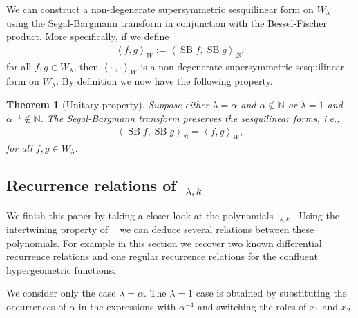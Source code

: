 \documentclass{amsart}
\newtheorem{theorem}{Theorem}
\numberwithin{theorem}{section}
\theoremstyle{definition}
\theoremstyle{remark}
\def\N{\mathds{N} }
\DeclareMathOperator{\KO}{\widetilde U}
\DeclareMathOperator{\SB}{\pil(C)}
\DeclareMathOperator{\rSB}{SB}
\newcommand{\bfip}[1]{\left<{#1}\right>_\mathcal B}
\newcommand{\ip}[1]{\left<{#1}\right>_W}
\DeclareMathOperator{\pil}{\pi_\lambda}
\begin{document}
We can construct a non-degenerate supersymmetric sesquilinear form on $W_\lambda$ using the Segal-Bargmann transform in conjunction with the Bessel-Fischer product. More specifically, if we define
\begin{align*}
\ip{f,g} := \bfip{\rSB f, \rSB g},
\end{align*}
for all $f,g\in W_\lambda$, then $\ip{\cdot \, , \cdot}$ is a non-degenerate supersymmetric sesquilinear form on $W_\lambda$. By definition we now have the following property.

\begin{theorem}[Unitary property]\label{PropUnitSB}
Suppose either $\lambda=\alpha$ and $\alpha\not\in \N$ or $\lambda=1$ and $\alpha^{-1}\not\in \N$. The Segal-Bargmann transform preserves the sesquilinear forms, i.e.,
\begin{align*}
\bfip{\rSB f,\rSB g} = \ip{f, g},
\end{align*}
for all $f,g\in W_\lambda$.
\end{theorem}

\subsection{Recurrence relations of $\KO_{\lambda,k}$}\label{SecOmega}
We finish this paper by taking a closer look at the polynomials $\KO_{\lambda,k}$. Using the intertwining property of $\SB$ we can deduce several relations between these polynomials. For example in this section we recover two known differential recurrence relations and one regular recurrence relations for the confluent hypergeometric functions. 

We consider only the case $\lambda=\alpha$. The $\lambda =1$ case is obtained by substituting the occurrences of $\alpha$ in the expressions with $\alpha^{-1}$ and switching the roles of $x_1$ and $x_2$.
\end{document}
